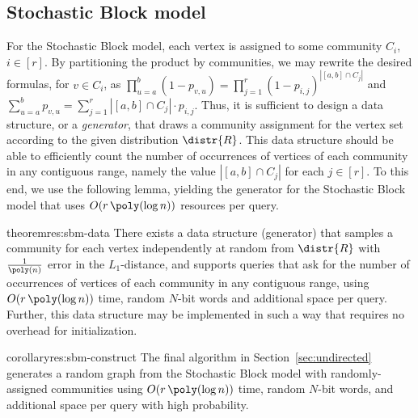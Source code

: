 \subsection{Stochastic Block model}
\label{sec:app_sbm}

For the Stochastic Block model, each vertex is assigned to some community $C_i$, $i \in [r]$. By partitioning the product by communities, we may rewrite the desired formulas, for $v \in C_i$, as $\prod_{u=a}^b (1-p_{v,u}) = \prod_{j=1}^r (1-p_{i,j})^{|[a,b]\cap C_j|}$ and $\sum_{u=a}^b p_{v,u}=\sum_{j=1}^r |[a,b]\cap C_j|\cdot p_{i,j}$. Thus, it is sufficient to design a data structure, or a \emph{generator}, that draws a community assignment for the vertex set according to the given distribution $\distr{R}$.
This data structure should be able to efficiently count the number of occurrences of vertices of each community in any contiguous range, namely the value $|[a,b]\cap C_j|$ for each $j \in [r]$.
To this end, we use the following lemma, yielding the generator for the Stochastic Block model that uses $O(r\, \poly(\log n))$ resources per query.

\begin{restatable}{theorem}{res:sbm-data}\label{thm:sbm-data}
There exists a data structure (generator) that samples a community for each vertex independently at random from $\distr{R}$ with $\frac{1}{\poly(n)}$ error in the $L_1$-distance, and supports queries that ask for the number of occurrences of vertices of each community in any contiguous range, using $O(r\,\poly(\log n))$ time, random $N$-bit words and additional space per query. Further, this data structure may be implemented in such a way that requires no overhead for initialization.
\end{restatable}
\begin{restatable}{corollary}{res:sbm-construct}\label{cor:sbm-construct}
The final algorithm in Section~\ref{sec:undirected} generates a random graph from the Stochastic Block model with randomly-assigned communities using $O(r\,\poly(\log n))$ time, random $N$-bit words, and additional space per query with high probability.
\end{restatable}

